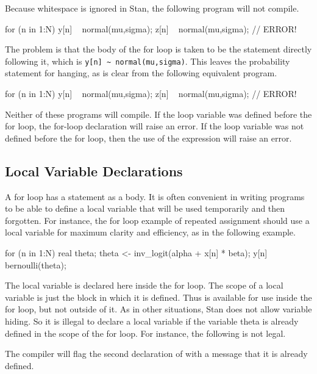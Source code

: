 Because whitespace is ignored in Stan, the following program will
not compile.
%
\begin{stancode}
for (n in 1:N)
  y[n] ~ normal(mu,sigma);
  z[n] ~ normal(mu,sigma); // ERROR!
\end{stancode}
%
The problem is that the body of the for loop is taken to be the
statement directly following it, which is
\Verb|y[n] ~ normal(mu,sigma)|.  This leaves the probability statement for
 hanging, as is clear from the following equivalent
program.
%
\begin{stancode}
for (n in 1:N) {
  y[n] ~ normal(mu,sigma);
}
z[n] ~ normal(mu,sigma); // ERROR!
\end{stancode}
%
Neither of these programs will compile. If the loop variable 
was defined before the for loop, the for-loop declaration will raise
an error.  If the loop variable  was not defined before the
for loop, then the use of the expression  will raise an
error.

\subsection{Local Variable Declarations}

A for loop has a statement as a body.  It is often convenient in
writing programs to be able to define a local variable that will be
used temporarily and then forgotten.  For instance, the for loop
example of repeated assignment should use a local variable for maximum
clarity and efficiency, as in the following example.
%
\begin{stancode}
for (n in 1:N) {
  real theta;
  theta <- inv_logit(alpha + x[n] * beta);
  y[n] ~ bernoulli(theta);
}
\end{stancode}
%
The local variable  is declared here inside the for loop.
The scope of a local variable is just the block in which it is
defined.  Thus  is available for use inside the for loop,
but not outside of it.  As in other situations, Stan does not allow
variable hiding.  So it is illegal to declare a local variable
 if the variable theta is already defined in the scope of
the for loop.  For instance, the following is not legal.
%
\begin{stancode}
for (m in 1:M) {
  real theta;
  for (n in 1:N) {
    real theta; // ERROR!
    theta <- inv_logit(alpha + x[m,n] * beta);
    y[m,n] ~ bernoulli(theta);
// ...
\end{stancode}
%
The compiler will flag the second declaration of  with a
message that it is already defined.

